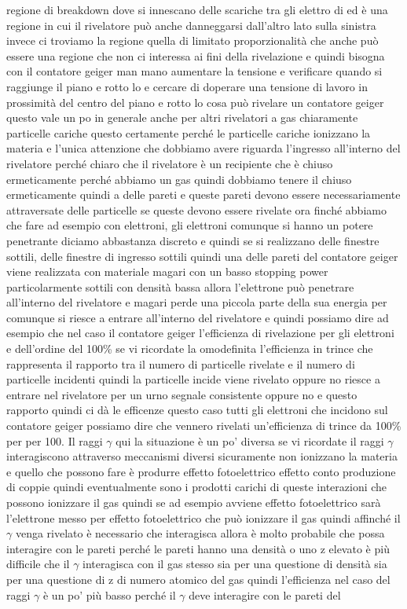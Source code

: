regione di breakdown dove si innescano delle scariche tra gli elettro di ed è una regione in cui il rivelatore può anche danneggarsi dall'altro lato sulla sinistra invece ci troviamo la regione quella di limitato proporzionalità che anche può essere una regione che non ci interessa ai fini della rivelazione e quindi bisogna con il contatore geiger man mano aumentare la tensione e verificare quando si raggiunge il piano e rotto lo e cercare di doperare una tensione di lavoro in prossimità del centro del piano e rotto lo cosa può rivelare un contatore geiger questo vale un po in generale anche per altri rivelatori a gas chiaramente particelle cariche questo certamente perché le particelle cariche ionizzano la materia e l'unica attenzione che dobbiamo avere riguarda l'ingresso all'interno del rivelatore perché chiaro che il rivelatore è un recipiente che è chiuso ermeticamente perché abbiamo un gas quindi dobbiamo tenere il chiuso ermeticamente quindi a delle pareti e queste pareti devono essere necessariamente attraversate delle particelle se queste devono essere rivelate ora finché abbiamo che fare ad esempio con elettroni, gli elettroni comunque si hanno un potere penetrante diciamo abbastanza discreto e quindi se si realizzano delle finestre sottili, delle finestre di ingresso sottili quindi una delle pareti del contatore geiger viene realizzata con materiale magari con un basso stopping power particolarmente sottili con densità bassa allora l'elettrone può penetrare all'interno del rivelatore e magari perde una piccola parte della sua energia per comunque si riesce a entrare all'interno del rivelatore e quindi possiamo dire ad esempio che nel caso il contatore geiger l'efficienza di rivelazione per gli elettroni e dell'ordine del 100\% se vi ricordate la omodefinita l'efficienza in trince che rappresenta il rapporto tra il numero di particelle rivelate e il numero di particelle incidenti quindi la particelle incide viene rivelato oppure no riesce a entrare nel rivelatore per un urno segnale consistente oppure no e questo rapporto quindi ci dà le efficenze questo caso tutti gli elettroni che incidono sul contatore geiger possiamo dire che vennero rivelati un'efficienza di trince da 100\% per per 100. Il raggi $\gamma$ qui la situazione è un po' diversa se vi ricordate il raggi $\gamma$ interagiscono attraverso meccanismi diversi sicuramente non ionizzano la materia e quello che possono fare è produrre effetto fotoelettrico effetto conto produzione di coppie quindi eventualmente sono i prodotti carichi di queste interazioni che possono ionizzare il gas quindi se ad esempio avviene effetto fotoelettrico sarà l'elettrone messo per effetto fotoelettrico che può ionizzare il gas quindi affinché il $\gamma$ venga rivelato è necessario che interagisca allora è molto probabile che possa interagire con le pareti perché le pareti hanno una densità o uno z elevato è più difficile che il $\gamma$ interagisca con il gas stesso sia per una questione di densità sia per una questione di z di numero atomico del gas quindi l'efficienza nel caso del raggi $\gamma$ è un po' più basso perché il $\gamma$ deve interagire con le pareti del 


